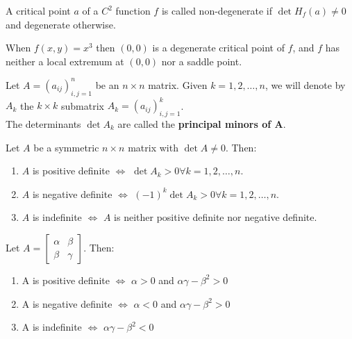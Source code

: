 \begin{definition}
    A critical point $a$ of a $C^2$ function $f$ is called non-degenerate if $\det H_f(a) \neq 0$ and degenerate otherwise.
\end{definition}

\begin{example}
    When $f(x,y) = x^3$ then $(0,0)$ is a degenerate critical point of $f$, and $f$ has neither a local extremum at $(0,0)$ nor a saddle point.
\end{example}

\begin{definition}
    Let $A = (a_{ij})^n_{i,j=1}$ be an $n \times n$ matrix. Given $k = 1, 2, \dots, n$, we will denote by $A_k$ the $k \times k$ submatrix $A_k = (a_{ij})^k_{i,j=1}$. \\
    The determinants $\det A_k$ are called the \textbf{principal minors of A}.
\end{definition}

\begin{proposition}
    Let $A$ be a symmetric $n \times n$ matrix with $\det A \neq 0$. Then:
    \begin{enumerate}
        \item $A$ is positive definite $\iff$ $\det A_k > 0 \forall k = 1, 2, \dots, n$.
        \item $A$ is negative definite $\iff$ $(-1)^k \det A_k > 0 \forall k = 1, 2, \dots, n$.
        \item $A$ is indefinite $\iff$ $A$ is neither positive definite nor negative definite.
    \end{enumerate}
\end{proposition}

\begin{corollary}
    Let $A = \begin{bmatrix}\alpha & \beta \\ \beta & \gamma \end{bmatrix}$. Then:
    \begin{enumerate}
        \item A is positive definite $\iff$ $\alpha > 0$ and $\alpha \gamma - \beta^2 > 0$
        \item A is negative definite $\iff$ $\alpha < 0$ and $\alpha \gamma - \beta^2 > 0$
        \item A is indefinite $\iff$ $\alpha \gamma - \beta^2 < 0$
    \end{enumerate}
\end{corollary}

